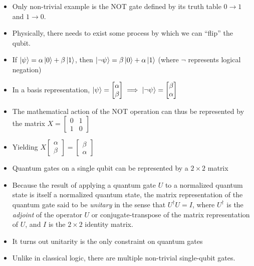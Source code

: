\documentclass{article}
\begin{document}
            \begin{itemize}
                \item Only non-trivial example is the NOT gate defined by its truth table $0 \to 1$ and $1 \to 0$.
                \item Physically, there needs to exist some process by which we can ``flip'' the qubit.
                \item If $\ket{\psi} = \alpha \ket{0} + \beta \ket{1}$, then $\ket{\lnot\psi} = \beta \ket{0} + \alpha \ket{1}$ (where $\lnot$ represents logical negation)
                \item In a basis representation, $\ket{\psi} = \begin{bmatrix} \alpha \\ \beta \end{bmatrix} \implies \ket{\lnot\psi} = \begin{bmatrix} \beta \\ \alpha \end{bmatrix}$
                \item The mathematical action of the NOT operation can thus be represented by the matrix $X = \begin{bmatrix}
                    0 & 1 \\
                    1 & 0 
                \end{bmatrix}$
                \item Yielding $X \begin{bmatrix} \alpha \\ \beta \end{bmatrix} = \begin{bmatrix} \beta \\ \alpha \end{bmatrix}$
                \item Quantum gates on a single qubit can be represented by a $2 \times 2$ matrix
                \item Because the result of applying a quantum gate $U$ to a normalized quantum state is itself a normalized quantum state, the matrix representation of the quantum gate said to be \emph{unitary} in the sense that $U^\dagger U = I$, where $U^\dagger$ is the \emph{adjoint} of the operator $U$ or conjugate-transpose of the matrix representation of $U$, and $I$ is the $2 \times 2$ identity matrix.
                \item It turns out unitarity is the only constraint on quantum gates
                \item Unlike in classical logic, there are multiple non-trivial single-qubit gates.

\end{itemize}
\end{document}

